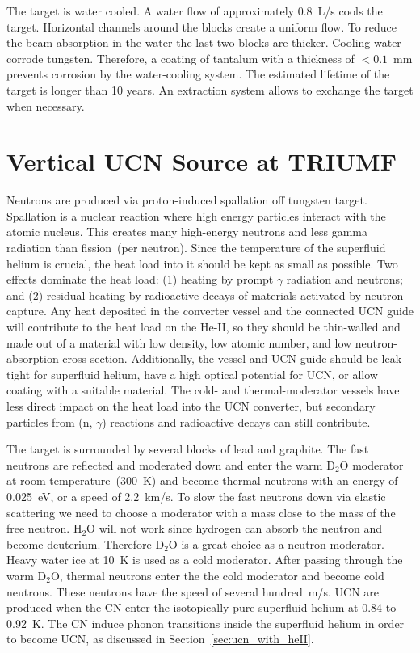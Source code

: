 The target is water cooled. A water flow of approximately
0.8~L/s cools the target. Horizontal channels around the blocks create
a uniform flow. To reduce the beam absorption in the water the last
two blocks are thicker. Cooling water corrode tungsten.  Therefore, a
coating of tantalum with a thickness of $< 0.1$~mm prevents corrosion
by the water-cooling system. The estimated lifetime of the target is
longer than 10 years. An extraction system allows to exchange the
target when necessary.


\section{Vertical UCN Source at TRIUMF\label{sec:vertical_source}}
Neutrons are produced via proton-induced spallation off tungsten
target. Spallation is a nuclear reaction where high energy particles
interact with the atomic nucleus. This creates many high-energy
neutrons and less gamma radiation than fission~(per neutron). Since
the temperature of the superfluid helium is crucial, the heat load
into it should be kept as small as possible. Two effects dominate the
heat load: (1) heating by prompt $\gamma$ radiation and neutrons; and
(2) residual heating by radioactive decays of materials activated by
neutron capture.  Any heat deposited in the converter vessel and the
connected UCN guide will contribute to the heat load on the He-II, so
they should be thin-walled and made out of a material with low
density, low atomic number, and low neutron-absorption cross
section. Additionally, the vessel and UCN guide should be leak-tight
for superfluid helium, have a high optical potential for UCN, or allow
coating with a suitable material. The cold- and thermal-moderator
vessels have less direct impact on the heat load into the UCN
converter, but secondary particles from (n, $\gamma$) reactions and
radioactive decays can still contribute.




The target is surrounded by several blocks of lead and graphite. The
fast neutrons are reflected and moderated down and enter the warm
D$_2$O moderator at room temperature~(300~K) and become thermal
neutrons with an energy of 0.025~eV, or a speed of 2.2~km/s. To slow
the fast neutrons down via elastic scattering we need to choose a
moderator with a mass close to the mass of the free neutron. H$_2$O
will not work since hydrogen can absorb the neutron and become
deuterium. Therefore D$_2$O is a great choice as a neutron moderator.
Heavy water ice at 10~K is used as a cold moderator. After passing
through the warm D$_2$O, thermal neutrons enter the the cold moderator
and become cold neutrons. These neutrons have the speed of several
hundred~m/s. UCN are produced when the CN enter the isotopically pure
superfluid helium at 0.84 to 0.92~K. The CN induce phonon transitions
inside the superfluid helium in order to become UCN, as discussed in
Section~\ref{sec:ucn_with_heII}.




